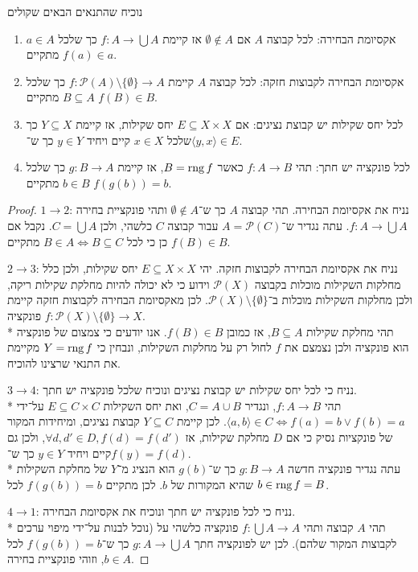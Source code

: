 \Question{}
נוכיח שהתנאים הבאים שקולים
\begin{enumerate}
	\item אקסיומת הבחירה: לכל קבוצה $A$ אם $\emptyset \notin A$ אז קיימת $f : A \to \bigcup A$ כך שלכל $a \in A$ מתקיים $f(a) \in a$.
	\item אקסיומת הבחירה לקבוצות חזקה: לכל קבוצה $A$ קיימת $f : \mathcal{P}(A) \setminus \{ \emptyset \} \to A$ כך שלכל $B \subseteq A$ מתקיים $f(B) \in B$.
	\item לכל יחס שקילות יש קבוצת נציגים: אם $E \subseteq X \times X$ יחס שקילות, אז קיימת $Y \subseteq X$ כך שלכל $x \in X$ קיים ויחיד $y \in Y$ כך ש־$\langle y, x \rangle \in E$.
	\item לכל פונקציה יש חתך: תהי $f : A \to B$ כאשר $B = \operatorname{rng} f$, אז קיימת $g : B \to A$ כך שלכל $b \in B$ מתקיים $f(g(b)) = b$.
\end{enumerate}
\begin{proof}
	$1 \to 2$:
	נניח את אקסיומת הבחירה.
	תהי קבוצה $A$ כך ש־$\emptyset \notin A$ ותהי פונקציית בחירה $f : A \to \bigcup A$.
	עתה נגדיר ש־$A = \mathcal{P}(C)$ עבור קבוצה $C$ כלשהי, ולכן $C = \bigcup A$.
	נקבל אם כן כי לכל $B \in A \iff B \subseteq C$ מתקיים $f(B) \in B$.

	$2 \to 3$:
	נניח את אקסיומת הבחירה לקבוצות חזקה.
	יהי $E \subseteq X \times X$ יחס שקילות, ולכן כלל מחלקות השקילות מוכלות בקבוצה $\mathcal{P}(X)$ וידוע כי לא יכולה להיות מחלקת שקילות ריקה, ולכן מחלקות השקילות מוכלות ב־$\mathcal{P}(X) \setminus \{ \emptyset \}$.
	לכן מאקסיומת הבחירה לקבוצות חזקה קיימת פונקציה $f : \mathcal{P}(X) \setminus \{ \emptyset \} \to X$. \\*
	תהי מחלקת שקילות $B \subseteq A$, אז כמובן $f(B) \in B$. אנו יודעים כי צמצום של פונקציה הוא פונקציה ולכן נצמצם את $f$ לחול רק על מחלקות השקילות, ונבחין כי $Y = \operatorname{rng} f$ מקיימת את התנאי שרצינו להוכיח.

	$3 \to 4$:
	נניח כי לכל יחס שקילות יש קבוצת נציגים ונוכיח שלכל פונקציה יש חתך. \\*
	תהי $f : A \to B$, ונגדיר $C = A \cup B$, ואת יחס השקילות $E \subseteq C \times C$ על־ידי $\langle a, b \rangle \in C \iff f(a) = b \lor f(b) = a$.
	לכן קיימת $Y \subseteq C$ קבוצת נציגים, ומיחידות המקור של פונקציות נסיק כי אם $D$ מחלקת שקילות, אז $\forall d, d' \in D, f(d) = f(d')$, ולכן גם קיים ויחיד $y \in Y$ כך ש־$f(y) = f(d)$. \\*
	עתה נגדיר פונקציה חדשה $g : B \to A$ כך ש־$g(b)$ הוא הנציג מ־$Y$ של מחלקת השקילות שהיא המקורות של $b$.
	לכן מתקיים $f(g(b)) = b$ לכל $b \in \operatorname{rng} f = B$.

	$4 \to 1$:
	נניח כי לכל פונקציה יש חתך ונוכיח את אקסיומת הבחירה. \\*
	תהי $A$ קבוצה ותהי $f : \bigcup A \to A$ פונקציה כלשהי על (נוכל לבנות על־ידי מיפוי ערכים לקבוצות המקור שלהם).
	לכן יש לפונקציה חתך $g : A \to \bigcup A$ כך ש־$f(g(b)) = b$ לכל $b \in A$, וזוהי פונקציית בחירה.
\end{proof}


